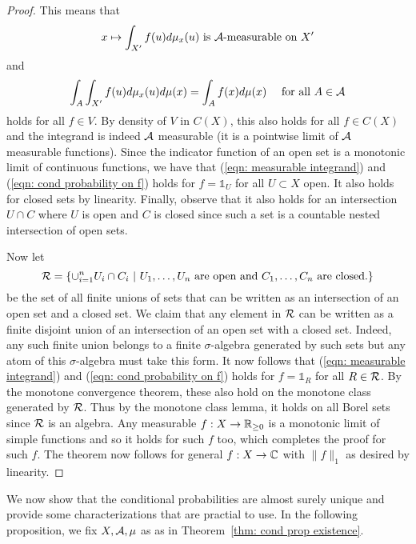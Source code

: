 \documentclass[twoside, a4paper, 10pt]{amsart}
\begin{document}
\begin{proof}
This means that \begin{align}\label{eqn: measurable integrand} x \mapsto \int_{X'} f(u) d\mu_x(u) \text{ is $\mathcal{A}$-measurable on $X'$} \end{align} and \begin{align}\label{eqn: cond probability on f} \int_{A} \int_{X'} f(u) d\mu_x(u) d\mu(x) = \int_A f(x) d\mu(x) \quad\text{ for all } A \in \mathcal{A} \end{align} holds for all $f \in V$. By density of $V$ in $C(X)$, this also holds for all $f \in C(X)$ and the integrand is indeed $\mathcal{A}$ measurable (it is a pointwise limit of $\mathcal{A}$ measurable functions). Since the indicator function of an open set is a monotonic limit of continuous functions, we have that (\ref{eqn: measurable integrand}) and (\ref{eqn: cond probability on f}) holds for $f = \mathds{1}_U$ for all $U \subset X$ open. It also holds for closed sets by linearity. Finally, observe that it also holds for an intersection $U \cap C$ where $U$ is open and $C$ is closed since such a set is a countable nested intersection of open sets.

Now let $$\mathcal{R} = \{ \cup_{i=1}^n U_i \cap C_i ~|~ U_1, \ldots, U_n \text{ are open and } C_1, \ldots, C_n \text{ are closed.} \}$$ be the set of all finite unions of sets that can be written as an intersection of an open set and a closed set. We claim that any element in $\mathcal{R}$ can be written as a finite disjoint union of an intersection of an open set with a closed set. Indeed, any such finite union belongs to a finite $\sigma$-algebra generated by such sets but any atom of this $\sigma$-algebra must take this form. It now follows that  (\ref{eqn: measurable integrand}) and (\ref{eqn: cond probability on f}) holds for $f = \mathds{1}_R$ for all $R \in \mathcal{R}$. By the monotone convergence theorem, these also hold on the monotone class generated by $\mathcal{R}$. Thus by the monotone class lemma, it holds on all Borel sets since $\mathcal{R}$ is an algebra. Any measurable $f:X \to \mathbb{R}_{\geq 0}$ is a monotonic limit of simple functions and so it holds for such $f$ too, which completes the proof for such $f$. The theorem now follows for general $f:X \to \mathbb{C}$ with $\|f\|_1$ as desired by linearity. \end{proof}

We now show that the conditional probabilities are almost surely unique and provide some characterizations that are practial to use. In the following proposition, we fix $X,\mathcal{A}, \mu$ as as in Theorem~\ref{thm: cond prop existence}.
\end{document}
